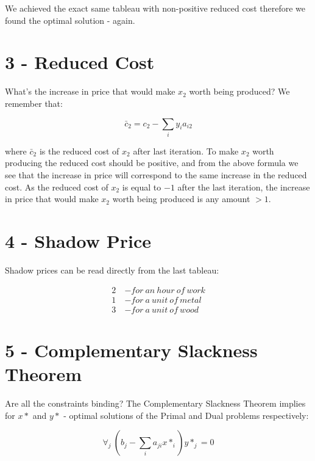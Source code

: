 \documentclass[
  letterpaper,
  DIV=11,
  numbers=noendperiod]{scrartcl}
\begin{document}
We achieved the exact same tableau with non-positive reduced cost
therefore we found the optimal solution - again.

\newpage

\section{3 - Reduced Cost}\label{reduced-cost}

What's the increase in price that would make \(x_2\) worth being
produced? \newline We remember that:

\[
\bar{c}_2 = c_2 - \sum_{i}{y_i a_{i2}}
\]

where \(\bar{c}_2\) is the reduced cost of \(x_2\) after last iteration.
\newline To make \(x_2\) worth producing the reduced cost should be
positive, and from the above formula we see that the increase in price
will correspond to the same increase in the reduced cost. As the reduced
cost of \(x_2\) is equal to \(-1\) after the last iteration, the
increase in price that would make \(x_2\) worth being produced is any
amount \(> 1\).

\newpage

\section{4 - Shadow Price}\label{shadow-price}

Shadow prices can be read directly from the last tableau:

\[
\begin{aligned}
2 \ & - for \ an \ hour \ of \ work \\
1 \ & - for \ a \ unit \ of \ metal \\
3 \ & - for \ a \ unit \ of \ wood
\end{aligned}
\]

\newpage

\section{5 - Complementary Slackness
Theorem}\label{complementary-slackness-theorem}

Are all the constraints binding? \newline The Complementary Slackness
Theorem implies for \(x*\) and \(y*\) - optimal solutions of the Primal
and Dual problems respectively:

\[
\forall_{j}{\ (b_j - \sum_{i}{a_{ji}x*_i})y*_j = 0}
\]
\end{document}
